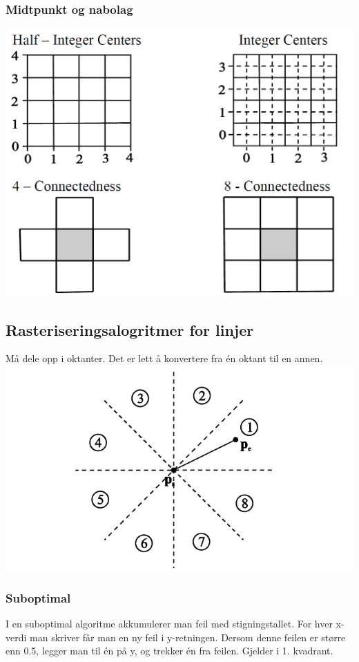 \subsubsection{Midtpunkt og nabolag}
\includegraphics[width=\textwidth]{Bilder/centers.png}

\subsection{Rasteriseringsalogritmer for linjer}
Må dele opp i oktanter. Det er lett å konvertere fra én oktant til en annen.
\\ \includegraphics[width=\textwidth]{Bilder/oct.png}

\subsubsection{Suboptimal}
I en suboptimal algoritme akkumulerer man feil med stigningstallet. For hver x-verdi man skriver får man en ny feil i y-retningen. Dersom denne feilen er større enn 0.5, legger man til én på y, og trekker én fra feilen. Gjelder i 1. kvadrant.

